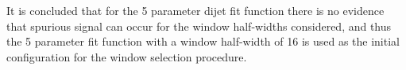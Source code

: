 It is concluded that for the 5 parameter dijet fit function there is no evidence that spurious signal can occur for the window half-widths considered,
and thus the 5 parameter fit function with a window half-width of 16 is used as the initial configuration for the window selection procedure.



